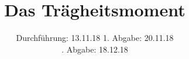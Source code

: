 

\subject{V101}
\title{Das Trägheitsmoment}
\date{%
  Durchführung: 13.11.18
  \hspace{3em}
  1. Abgabe: 20.11.18\\
  \hspace{14em}\!\!. Abgabe: 18.12.18
}



\maketitle
\thispagestyle{empty}
\tableofcontents
\newpage







\printbibliography{}


